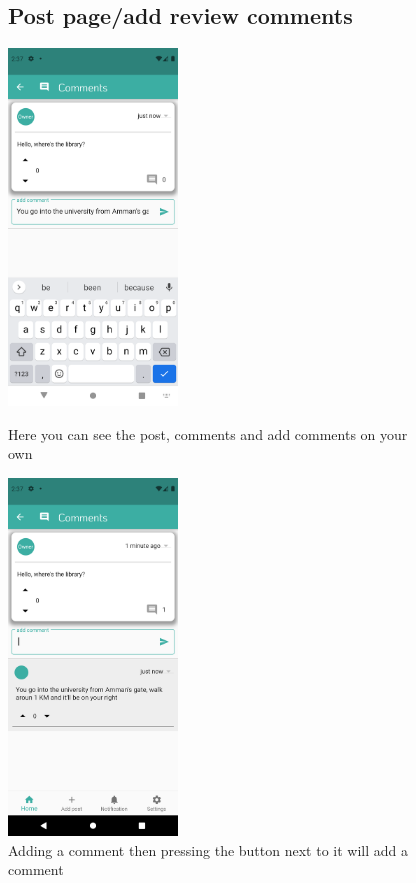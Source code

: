 \documentclass[12pt]{article}
\begin{document}
\begin{figure}[h!]
  \subsection*{Post page/add review comments}
{\includegraphics[width=0.4\textwidth]{./Screenshots/14.PNG}}
  \caption{Here you can see the post, comments and add comments on your own}
  \end{figure}

\begin{figure}[h!]
\centerline{\includegraphics[width=0.4\textwidth]{./Screenshots/15.PNG}}
  \caption{Adding a comment then pressing the button next to it will add a comment}
  \end{figure}
\end{document}
